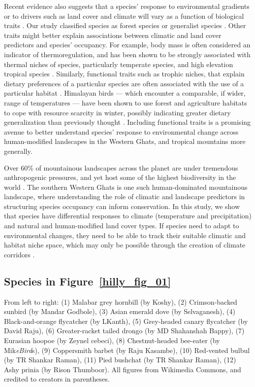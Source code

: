 Recent evidence also suggests that a species' response to environmental gradients or to drivers such as land cover and climate will vary as a function of biological traits \citep{mcgill2006}.
Our study classified species as forest species or generalist species \citep{ali1983}.
Other traits might better explain associations between climatic and land cover predictors and species' occupancy.
For example, body mass is often considered an indicator of thermoregulation, and has been shown to be strongly associated with thermal niches of species, particularly temperate species, and high elevation tropical species \citep{barve2021}.
Similarly, functional traits such as trophic niches, that explain dietary preferences of a particular species are often associated with the use of a particular habitat \citep{pigot2020}.
Himalayan birds --- which encounter a comparable, if wider, range of temperatures --- have been shown to use forest and agriculture habitats to cope with resource scarcity in winter, possibly indicating greater dietary generalization than previously thought \citep{elsen2018}.
Including functional traits is a promising avenue to better understand species' response to environmental change across human-modified landscapes in the Western Ghats, and tropical mountains more generally.

Over 60\% of mountainous landscapes across the planet are under tremendous anthropogenic pressures, and yet host some of the highest biodiversity in the world \citep{lasorte2010,elsen2020}.
The southern Western Ghats is one such human-dominated mountainous landscape, where understanding the role of climatic and landscape predictors in structuring species occupancy can inform conservation.
In this study, we show that species have differential responses to climate (temperature and precipitation) and natural and human-modified land cover types.
If species need to adapt to environmental changes, they need to be able to track their suitable climatic and habitat niche space, which may only be possible through the creation of climate corridors \citep{freeman2018}.

\subsection*{Species in Figure~\ref{hilly_fig_01}}

From left to right: (1) Malabar grey hornbill (by Koshy), (2) Crimson-backed sunbird (by Mandar Godbole), (3) Asian emerald dove (by Selvaganesh), (4) Black-and-orange flycatcher (by LKanth), (5) Grey-headed canary flycatcher (by David Raju), (6) Greater-racket tailed drongo (by MD Shahanshah Bappy), (7) Eurasian hoopoe (by Zeynel cebeci), (8) Chestnut-headed bee-eater (by Mik\textit{eBird}s), (9) Coppersmith barbet (by Raju Kasambe), (10) Red-vented bulbul (by TR Shankar Raman), (11) Pied bushchat (by TR Shankar Raman), (12) Ashy prinia (by Rison Thumboor). All figures from Wikimedia Commons, and credited to creators in parentheses.

